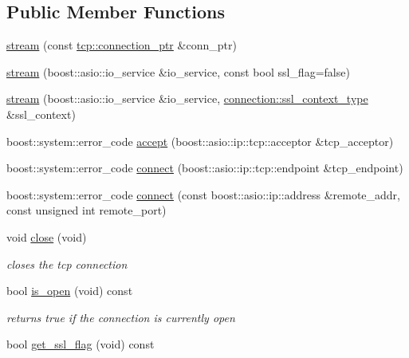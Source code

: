\subsection*{Public Member Functions}
\begin{DoxyCompactItemize}
\item 
\hyperlink{classpion_1_1tcp_1_1stream_a12129bbe7550db52ca7d194908f13565}{stream} (const \hyperlink{namespacepion_1_1tcp_a6c9b7497068009f6d81d95ec0b0627d6}{tcp\-::connection\-\_\-ptr} \&conn\-\_\-ptr)
\item 
\hyperlink{classpion_1_1tcp_1_1stream_aee8bf2f4b4af54b0e946552bb3c42cb2}{stream} (boost\-::asio\-::io\-\_\-service \&io\-\_\-service, const bool ssl\-\_\-flag=false)
\item 
\hyperlink{classpion_1_1tcp_1_1stream_a00241ca354c2f8ee48cc2f443c001464}{stream} (boost\-::asio\-::io\-\_\-service \&io\-\_\-service, \hyperlink{classpion_1_1tcp_1_1connection_a8587c35bbf48a119aa82f228e779a30e}{connection\-::ssl\-\_\-context\-\_\-type} \&ssl\-\_\-context)
\item 
boost\-::system\-::error\-\_\-code \hyperlink{classpion_1_1tcp_1_1stream_aa9a0601a3f0d969c795b363e9aa932a6}{accept} (boost\-::asio\-::ip\-::tcp\-::acceptor \&tcp\-\_\-acceptor)
\item 
boost\-::system\-::error\-\_\-code \hyperlink{classpion_1_1tcp_1_1stream_a6f420f12a9f3586dba9d9b14632e42b8}{connect} (boost\-::asio\-::ip\-::tcp\-::endpoint \&tcp\-\_\-endpoint)
\item 
boost\-::system\-::error\-\_\-code \hyperlink{classpion_1_1tcp_1_1stream_a81cbfbba0a2849ec2476eee75f1ff9df}{connect} (const boost\-::asio\-::ip\-::address \&remote\-\_\-addr, const unsigned int remote\-\_\-port)
\item 
void \hyperlink{classpion_1_1tcp_1_1stream_a5d77399767f11fe4ebd7e8ee9e41bf4c}{close} (void)
\begin{DoxyCompactList}\small\item\em closes the tcp connection \end{DoxyCompactList}\item 
bool \hyperlink{classpion_1_1tcp_1_1stream_a4e27277109a8a65e4d8824955a70f495}{is\-\_\-open} (void) const 
\begin{DoxyCompactList}\small\item\em returns true if the connection is currently open \end{DoxyCompactList}\item 
bool \hyperlink{classpion_1_1tcp_1_1stream_acdd826b93ef7eb171f86f26226f293eb}{get\-\_\-ssl\-\_\-flag} (void) const 

\end{DoxyCompactItemize}
